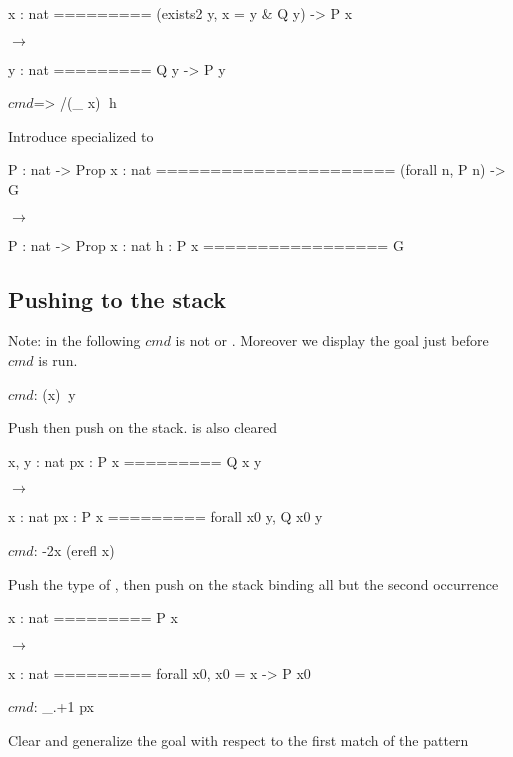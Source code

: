 \begin{landscape}
\begin{small}
\begin{multicols*}{3}[\begin{center}\section*{}\end{center}]
\begin{cheatout}
 x : nat
=========
 (exists2 y,
   x = y & Q y) -> P x
\end{cheatout}
$\to$
\begin{cheatout}
 y : nat
=========
 Q y -> P y
$~$
\end{cheatout}

\begin{cheat}
$cmd$=> /(_ x)$\;$ h
\end{cheat}
Introduce  specialized to 


\begin{cheatout}
 P : nat -> Prop
 x : nat
======================
 (forall n, P n) -> G
$~$
\end{cheatout}
$\to$
\begin{cheatout}
 P : nat -> Prop
 x : nat
 h : P x
=================
 G
\end{cheatout}


\subsection*{Pushing to the stack}
Note: in the following $cmd$ is not
 or . Moreover we display the
goal just before $cmd$ is run.

\begin{cheat}
$cmd$: (x)$\;\;$y
\end{cheat}
  Push  then push  on the stack.  is also cleared

\begin{cheatout}
 x, y : nat
 px : P x
=========
 Q x y
\end{cheatout}
$\to$
\begin{cheatout}
 x : nat
 px : P x
=========
 forall x0 y, Q x0 y
\end{cheatout}


\begin{cheat}
$cmd$: {-2}x (erefl x)
\end{cheat}
  Push the type of , then push  on the stack
  binding all but the second occurrence

\begin{cheatout}
 x : nat
=========
 P x
$~$
\end{cheatout}
$\to$
\begin{cheatout}
 x : nat
=========
 forall x0,
  x0 = x -> P x0
\end{cheatout}


\columnbreak

\begin{cheat}
$cmd$: _.+1 {px}
\end{cheat}
  Clear  and generalize the goal with
  respect to the first match of the pattern 


\end{multicols*}
\end{small}
\end{landscape}
